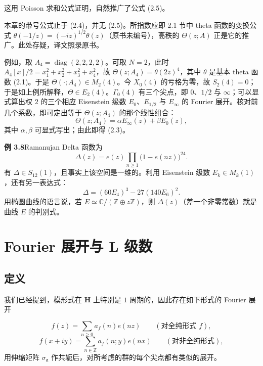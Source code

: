 这用 Poisson 求和公式证明，自然推广了公式 (2.5)。

\begin{annote}
本章的带号公式止于 (2.4)，并无 (2.5)。所指数应即 2.1 节中 theta 函数的变换公式 $\theta(-1/z)=(-iz)^{1/2}\theta(z)$（原书未编号），高秩的 $\Theta(z;A)$ 正是它的推广。此处存疑，译文照录原书。
\par\vspace{0.15em}{\raggedleft 【来源：原书 §2.1、§3（A）】\par}
\end{annote}

例如，取 $A_{4}=\operatorname{diag}(2,2,2,2)$。可取 $N=2$，此时 $A_{4}[x]/2=x_{1}^{2}+x_{2}^{2}+x_{3}^{2}+x_{4}^{2}$，故 $\Theta(z;A_{4})=\theta(2z)^{4}$，其中 $\theta$ 是基本 theta 函数 (2.1)。于是 $\Theta(\cdot;A_{4})\in M_{2}(4)$。今 $X_{0}(4)$ 的亏格为零，故 $S_{2}(4)=0$；于是如上例所解释，$\Theta\in E_{2}(4)$。$\Gamma_{0}(4)$ 有三个尖点，即 $0$、$1/2$ 与 $\infty$；可以显式算出权 $2$ 的三个相应 Eisenstein 级数 $E_{0}$、$E_{1/2}$ 与 $E_{\infty}$ 的 Fourier 展开。核对前几个系数，即可定出等于 $\Theta(z;A_{4})$ 的那个线性组合：
\[
\Theta(z;A_{4})=\alpha E_{\infty}(z)+\beta E_{0}(z),
\]
其中 $\alpha,\beta$ 可显式写出；由此即得 (2.3)。

\par\medskip\noindent\textbf{例 3.8}\quad Ramanujan Delta 函数为
\[
\Delta(z)=e(z)\prod_{n\ge1}\bigl(1-e(nz)\bigr)^{24}.
\]
有 $\Delta\in S_{12}(1)$，且事实上该空间是一维的。利用 Eisenstein 级数 $E_{k}\in M_{k}(1)$，还有另一表达式：
\[
\Delta=(60E_{4})^{3}-27(140E_{6})^{2}.
\]
用椭圆曲线的语言说，若 $E\simeq\mathbb{C}/(\mathbb{Z}\oplus z\mathbb{Z})$，则 $\Delta(z)$（差一个非零常数）就是曲线 $E$ 的判别式。

\section{Fourier 展开与 L 级数}\label{c3:sec:4}

\subsection{定义}\label{c3:sec:4.1}

我们已经提到，模形式在 $\mathbf{H}$ 上特别是 $1$ 周期的，因此存在如下形式的 Fourier 展开

\begin{equation}\tag{4.1}\label{c3:eq:4.1}
f(z)=\sum_{n\ge0}a_{f}(n)e(nz)\qquad(\text{对全纯形式 }f),
\end{equation}
\begin{equation}\tag{4.2}\label{c3:eq:4.2}
f(x+iy)=\sum_{n\in\mathbb{Z}}a_{f}(n;y)e(nx)\qquad(\text{对非全纯形式}),
\end{equation}
用伸缩矩阵 $\sigma_{\mathfrak{a}}$ 作共轭后，对所考虑的群的每个尖点都有类似的展开。

